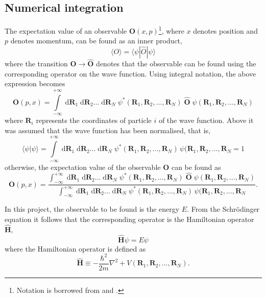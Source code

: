 \documentclass[a4paper,11pt]{article}
\newcommand{\diff}{\ensuremath{\; \text{d}}}
\begin{document}
\subsection{Numerical integration}
The expectation value of an observable $\mathbf{O}(x,p)$\footnote{Notation is borrowed from \cite{Griffiths:2005} and \cite{MHJ:2013}.}, where $x$ denotes position and $p$ denotes momentum, can be found as an inner product,
\begin{equation}
    \langle O \rangle   =   \langle \psi | \hat{O} | \psi \rangle
    \label{eq:observable}
\end{equation}
where the transition $\mathbf{O} \to \hat{\mathbf{O}}$ denotes that the observable can be found using the corresponding operator on the wave function. Using integral notation, the above expression becomes
\begin{equation}
    \mathbf{O}(p,x)   =   \int\limits_{-\infty}^{+\infty} \diff \mathbf{R}_1 \diff \mathbf{R}_2 \dots \diff \mathbf{R}_N \; \psi^*(\mathbf{R}_1, \mathbf{R}_2, \dots, \mathbf{R}_N ) \; \hat{\mathbf{O}} \; \psi(\mathbf{R}_1, \mathbf{R}_2, \dots, \mathbf{R}_N )
    \label{eq:observable_int1}
\end{equation}
where $\mathbf{R}_i$ represents the coordinates of particle $i$ of the wave function. Above it was assumed that the wave function has been normalised, that is,
\[ \langle \psi | \psi \rangle = \int\limits_{-\infty}^{+\infty}\! \diff \mathbf{R}_1 \diff \mathbf{R}_2 \dots \diff \mathbf{R}_N \; \psi^*(\mathbf{R}_1, \mathbf{R}_2, \dots, \mathbf{R}_N ) \, \psi(\mathbf{R}_1, \mathbf{R}_2, \dots, \mathbf{R}_N = 1 \]
otherwise, the expectation value of the observable $\mathbf{O}$ can be found as
\begin{equation}
    \mathbf{O}(p,x)   =   \frac{\int_{-\infty}^{+\infty} \diff \mathbf{R}_1 \diff \mathbf{R}_2 \dots \diff \mathbf{R}_N \; \psi^*(\mathbf{R}_1, \mathbf{R}_2, \dots, \mathbf{R}_N ) \; \hat{\mathbf{O}} \; \psi(\mathbf{R}_1, \mathbf{R}_2, \dots, \mathbf{R}_N ) }{ \int_{-\infty}^{+\infty} \diff \mathbf{R}_1 \diff \mathbf{R}_2 \dots \diff \mathbf{R}_N \; \psi^*(\mathbf{R}_1, \mathbf{R}_2, \dots, \mathbf{R}_N ) \, \psi(\mathbf{R}_1, \mathbf{R}_2, \dots, \mathbf{R}_N }.
    \label{eq:observable_final}
\end{equation}

In this project, the observable to be found is the energy $E$. From the Schr\"odinger equation it follows that the corresponding operator is the Hamiltonian operator $\hat{\mathbf{H}}$,
\begin{equation}
    \hat{\mathbf{H}} \psi = E \psi
    \label{eq:schrodinger}
\end{equation}
where the Hamiltonian operator is defined as
\begin{equation}
    \hat{\mathbf{H}}    \equiv  -\frac{\hbar^2}{2m} \nabla^2 + V(\mathbf{R}_1, \mathbf{R}_2, \dots, \mathbf{R}_N).
    \label{eq:hamiltonian}
\end{equation}
\end{document}
